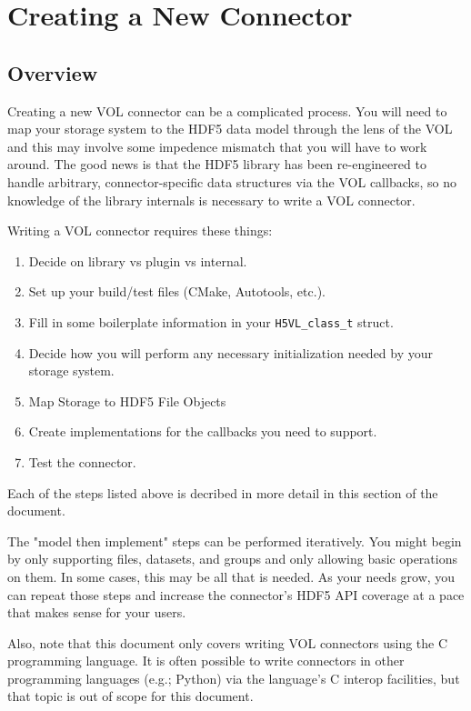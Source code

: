 \section{Creating a New Connector}

\subsection{Overview}
Creating a new VOL connector can be a complicated process. You will need to map
your storage system to the HDF5 data model through the lens of the VOL and this
may involve some impedence mismatch that you will have to work around. The good
news is that the HDF5 library has been re-engineered to handle arbitrary,
connector-specific data structures via the VOL callbacks, so no knowledge of
the library internals is necessary to write a VOL connector.

Writing a VOL connector requires these things:

\begin{enumerate}
    \item Decide on library vs plugin vs internal.
    \item Set up your build/test files (CMake, Autotools, etc.).
    \item Fill in some boilerplate information in your {\tt H5VL\_class\_t} struct.
    \item Decide how you will perform any necessary initialization needed
        by your storage system.
    \item Map Storage to HDF5 File Objects
    \item Create implementations for the callbacks you need to support.
    \item Test the connector.
\end{enumerate}

Each of the steps listed above is decribed in more detail in this section of the document.

The "model then implement" steps can be performed iteratively. You might begin
by only supporting files, datasets, and groups and only allowing basic operations
on them. In some cases, this may be all that is needed. As your needs grow, you
can repeat those steps and increase the connector's HDF5 API coverage at a pace
that makes sense for your users.

Also, note that this document only covers writing VOL connectors using the
C programming language. It is often possible to write connectors in other programming languages
(e.g.; Python) via the language's C interop facilities, but that topic is out of
scope for this document.

